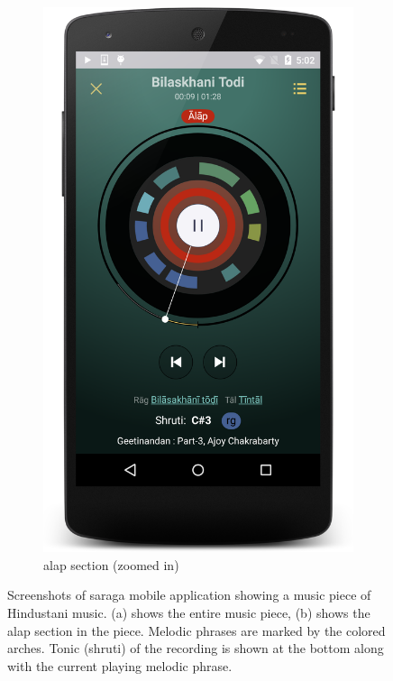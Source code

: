 \begin{figure}
\begin{subfigure}[b]{0.48\textwidth}
		\includegraphics[width=\figSizeNinety]{ch08_applications/figures/saraga2.png}
		\caption{\Gls{alap} section (zoomed in)}
		\label{fig:saraga_alap_section}
	\end{subfigure}
	\caption[Screenshots of \gls{saraga} mobile application]{Screenshots of \gls{saraga} mobile application showing a music piece of Hindustani music. (a) shows the entire music piece, (b) shows the \gls{alap} section in the piece. Melodic phrases are marked by the colored arches. Tonic (\gls{shruti}) of the recording is shown at the bottom along with the current playing melodic phrase.}
	\label{fig:saraga_screens}
\end{figure}

